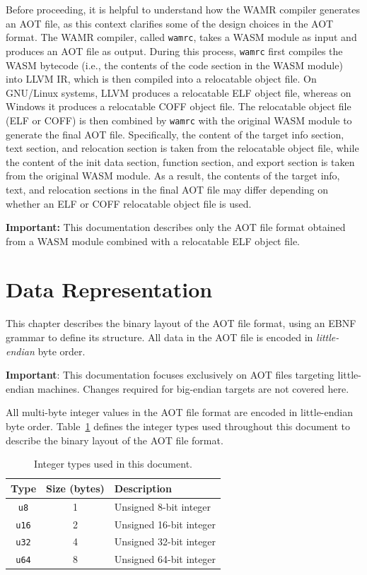 \documentclass{article}
\begin{document}
Before proceeding, it is helpful to understand how the WAMR compiler generates an AOT file, as this context clarifies some of the design choices in the AOT format.
The WAMR compiler, called \verb|wamrc|, takes a WASM module as input and produces an AOT file as output.
During this process, \verb|wamrc| first compiles the WASM bytecode (i.e., the contents of the code section in the WASM module) into LLVM IR, which is then compiled into a relocatable object file.
On GNU/Linux systems, LLVM produces a relocatable ELF object file, whereas on Windows it produces a relocatable COFF object file.
The relocatable object file (ELF or COFF) is then combined by \verb|wamrc| with the original WASM module to generate the final AOT file.
Specifically, the content of the target info section, text section, and relocation section is taken from the relocatable object file, while the content of the init data section, function section, and export section is taken from the original WASM module.
As a result, the contents of the target info, text, and relocation sections in the final AOT file may differ depending on whether an ELF or COFF relocatable object file is used.

\medskip
\textbf{Important:} This documentation describes only the AOT file format obtained from a WASM module combined with a relocatable ELF object file.

\section{Data Representation}

This chapter describes the binary layout of the AOT file format, using an EBNF grammar to define its structure.
All data in the AOT file is encoded in \textit{little-endian} byte order.

\medskip
\textbf{Important}: This documentation focuses exclusively on AOT files targeting little-endian machines. Changes required for big-endian targets are not covered here.
\medskip

All multi-byte integer values in the AOT file format are encoded in little-endian byte order.
Table~\ref{table:primitive-types} defines the integer types used throughout this document to describe the binary layout of the AOT file format.

\begin{table}[H]
\centering
\begin{tabular}{ccl}
    \hline
    Type & Size (bytes) & Description \\
    \hline
    \verb|u8|  & 1 & Unsigned 8-bit integer \\
    \verb|u16| & 2 & Unsigned 16-bit integer \\
    \verb|u32| & 4 & Unsigned 32-bit integer \\
    \verb|u64| & 8 & Unsigned 64-bit integer \\
    \hline
\end{tabular}
\caption{Integer types used in this document.}
\label{table:primitive-types}
\end{table}
\end{document}
